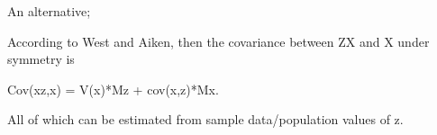 \documentclass[doc, babel,english]{apa}%
\begin{document}
An alternative;

According to West and Aiken, then the covariance between ZX and X under symmetry is
 
                                                                                                        Cov(xz,x) = V(x)*Mz + cov(x,z)*Mx.
                                                                                                        
                                                                                                        All of which can be estimated from sample data/population values of z. 



%
%	










\end{document}
